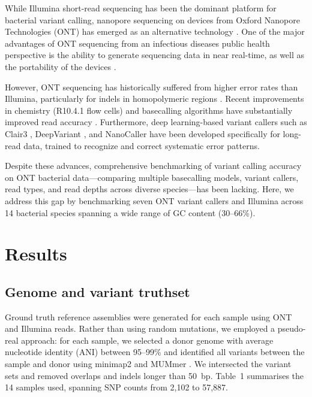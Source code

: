 \documentclass[11pt]{article}
\begin{document}
While Illumina short-read sequencing has been the dominant platform for bacterial variant calling, nanopore sequencing on devices from Oxford Nanopore Technologies (ONT) has emerged as an alternative technology \citep{hasan2021}. One of the major advantages of ONT sequencing from an infectious diseases public health perspective is the ability to generate sequencing data in near real-time, as well as the portability of the devices \citep{quick2016,faria2016}.

However, ONT sequencing has historically suffered from higher error rates than Illumina, particularly for indels in homopolymeric regions \citep{sahlin2021}. Recent improvements in chemistry (R10.4.1 flow cells) and basecalling algorithms have substantially improved read accuracy \citep{morrison2023,wright2024,deSestoEmiliani2022}. Furthermore, deep learning-based variant callers such as Clair3 \citep{zheng2022}, DeepVariant \citep{poplin2018}, and NanoCaller \citep{ahsan2021} have been developed specifically for long-read data, trained to recognize and correct systematic error patterns.

Despite these advances, comprehensive benchmarking of variant calling accuracy on ONT bacterial data---comparing multiple basecalling models, variant callers, read types, and read depths across diverse species---has been lacking. Here, we address this gap by benchmarking seven ONT variant callers and Illumina across 14 bacterial species spanning a wide range of GC content (30--66\%).

\section{Results}

\subsection{Genome and variant truthset}

Ground truth reference assemblies were generated for each sample using ONT and Illumina reads. Rather than using random mutations, we employed a pseudo-real approach: for each sample, we selected a donor genome with average nucleotide identity (ANI) between 95--99\% and identified all variants between the sample and donor using minimap2 \citep{li2018} and MUMmer \citep{marcais2018}. We intersected the variant sets and removed overlaps and indels longer than 50~bp. Table~1 summarises the 14 samples used, spanning SNP counts from 2,102 to 57,887.
\end{document}
